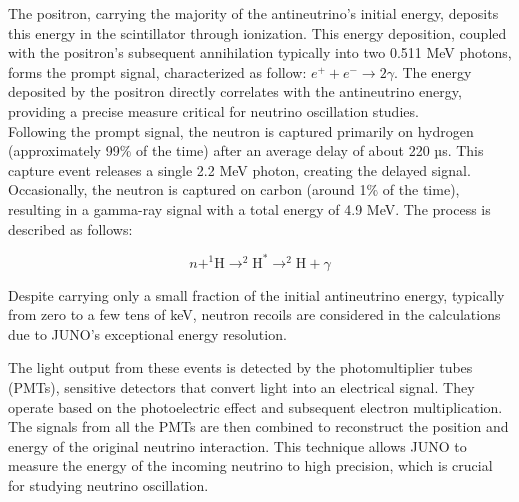 The positron, carrying the majority of the antineutrino's initial energy, deposits this energy in the scintillator through ionization. This energy deposition, coupled with the positron's subsequent annihilation typically into two 0.511 MeV photons, forms the prompt signal, characterized as follow: $e^{+} + e^{-} \rightarrow 2\gamma$.
The energy deposited by the positron directly correlates with the antineutrino energy, providing a precise measure critical for neutrino oscillation studies.\\

Following the prompt signal, the neutron is captured primarily on hydrogen (approximately 99$\%$ of the time) after an average delay of about 220 µs. This capture event releases a single 2.2 MeV photon, creating the delayed signal. Occasionally, the neutron is captured on carbon (around 1$\%$ of the time), resulting in a gamma-ray signal with a total energy of 4.9 MeV. The process is described as follows:

\begin{equation}
	 n + ^{1}\text{H} \rightarrow ^{2}\text{H}^{*} \rightarrow ^2\text{H} + \gamma
\end{equation}
 
Despite carrying only a small fraction of the initial antineutrino energy, typically from zero to a few tens of keV, neutron recoils are considered in the calculations due to JUNO's exceptional energy resolution.

The light output from these events is detected by the photomultiplier tubes (PMTs), sensitive detectors that convert light into an electrical signal. They operate based on the photoelectric effect and subsequent electron multiplication. The signals from all the PMTs are then combined to reconstruct the position and energy of the original neutrino interaction. This technique allows JUNO to measure the energy of the incoming neutrino to high precision, which is crucial for studying neutrino oscillation. %

